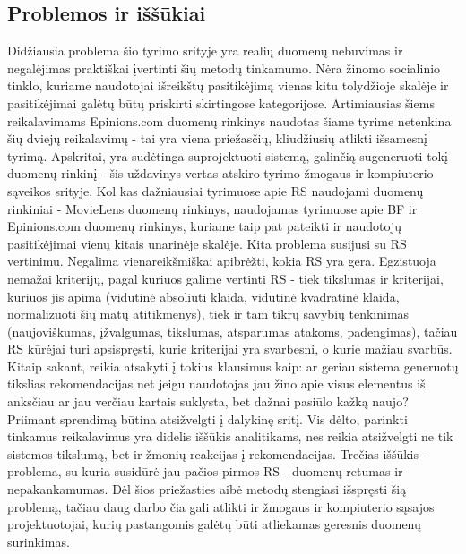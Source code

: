 \documentclass{VUMIFInfMagistrinis}
\begin{document}
\subsection{Problemos ir iššūkiai}
Didžiausia problema šio tyrimo srityje yra realių duomenų nebuvimas ir negalėjimas praktiškai įvertinti šių metodų tinkamumo. Nėra žinomo socialinio tinklo, kuriame naudotojai išreikštų pasitikėjimą vienas kitu tolydžioje skalėje ir pasitikėjimai galėtų būtų priskirti skirtingose kategorijose. Artimiausias šiems reikalavimams Epinions.com duomenų rinkinys naudotas šiame tyrime netenkina šių dviejų reikalavimų - tai yra viena priežasčių, kliudžiusių atlikti išsamesnį tyrimą. Apskritai, yra sudėtinga suprojektuoti sistemą, galinčią sugeneruoti tokį duomenų rinkinį - šis uždavinys vertas atskiro tyrimo žmogaus ir kompiuterio sąveikos srityje. Kol kas dažniausiai tyrimuose apie RS naudojami duomenų rinkiniai - MovieLens duomenų rinkinys, naudojamas tyrimuose apie BF ir Epinions.com duomenų rinkinys, kuriame taip pat pateikti ir naudotojų pasitikėjimai vienų kitais unarinėje skalėje.
\newline
\indent
Kita problema susijusi su RS vertinimu. Negalima vienareikšmiškai apibrėžti, kokia RS yra gera. Egzistuoja nemažai kriterijų, pagal kuriuos galime vertinti RS - tiek tikslumas ir kriterijai, kuriuos jis apima (vidutinė absoliuti klaida, vidutinė kvadratinė klaida, normalizuoti šių matų atitikmenys), tiek ir tam tikrų savybių tenkinimas (naujoviškumas, įžvalgumas, tikslumas, atsparumas atakoms, padengimas), tačiau RS kūrėjai turi apsispręsti, kurie kriterijai yra svarbesni, o kurie mažiau svarbūs. Kitaip sakant, reikia atsakyti į tokius klausimus kaip: ar geriau sistema generuotų tikslias rekomendacijas net jeigu naudotojas jau žino apie visus elementus iš anksčiau ar jau verčiau kartais suklysta, bet dažnai pasiūlo kažką naujo? Priimant sprendimą būtina atsižvelgti į dalykinę sritį. Vis dėlto, parinkti tinkamus reikalavimus yra didelis iššūkis analitikams, nes reikia atsižvelgti ne tik sistemos tikslumą, bet ir žmonių reakcijas į rekomendacijas.
\newline
\indent
Trečias iššūkis - problema, su kuria susidūrė jau pačios pirmos RS - duomenų retumas ir nepakankamumas. Dėl šios priežasties aibė metodų stengiasi išspręsti šią problemą, tačiau daug darbo čia gali atlikti ir žmogaus ir kompiuterio sąsajos projektuotojai, kurių pastangomis galėtų būti atliekamas geresnis duomenų surinkimas. 
\newline
\indent
\end{document}
